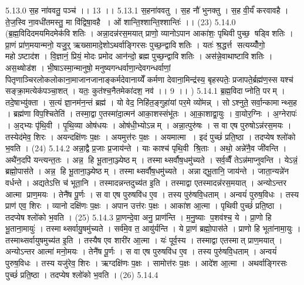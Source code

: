 \setcounter{anuvakam}{0}
5.13.0
स॒ह ना॑ववतु॒ पञ्च॑ ।। 13 ।।
5.13.1
स॒हना॑ववतु । स॒ह नौ॑ भुनक्तु । स॒ह वी॒र्यं॑ करवावहै । ते॒ज॒स्वि ना॒वधी॑तमस्तु॒ मा वि॑द्विषा॒वहै । ओं शान्ति॒श्शान्ति॒श्शान्तिः॑ ।। (23)
5.14.0
(ब्र॒ह्म॒विदिदमयमिदमेक॑विशतिः । अन्ना॒दन्न॑रस॒मयात् प्राणो॒ व्यानोऽपान आका॑शः॒ पृथिवी पुच्छ॒॒ षड्वि॑शतिः । प्रा॒णं प्रा॑ण॒मयान्मनो॒ यजु॒र्॒ ऋख्सामादे॒शोऽथर्वाङ्गिरसः पुच्छ॒न्द्वावि॑शतिः । यतः॑ श्र॒द्धर्त्त सत्यय्योँ॑गो॒ महोऽष्टाद॑श । वि॒ज्ञानं॒ प्रियं॒ मोदः प्रमोद आन॑न्दो॒ ब्रह्म पुच्छ॒न्द्वावि॑शतिः । अस॑न्ने॒वाथाष्टावि॑शतिः । अस॒थ्षोड॑श । भी॒षाऽस्मा॒न्मानुषो॒ मनुष्यगन्धर्वाणा॒न्देवगन्धर्वाणां॒ पितृणाञ्चिरलोकलोकाना॒माजानजानाङ्कर्मदेवानाय्येँ कर्मणा देवाना॒मिन्द्र॑स्य॒ बृहस्पतेः॒ प्रजापते॒र्ब्रह्म॑ण॒स्स यश्च॑ सङ्क्रा॒मत्येक॑पञ्चा॒शत् । यतः॒ कुत॑श्च॒नैतमेका॑दश॒ नव॑ ।। 9 ।। )
5.14.1
ब्र॒ह्म॒विदाप्नोति॒ परम् । तदे॒षाभ्यु॑क्ता । स॒त्यं ज्ञा॒नम॑न॒न्तं ब्रह्म॑ । यो वेद॒ निहि॑त॒ङ्गुहा॑यां पर॒मे व्यो॑मन्न् । सोऽश्नुते॒ सर्वा॒न्कामान्थ्स॒ह । ब्रह्म॑णा विप॒श्चितेति॑ । तस्मा॒द्वा ए॒तस्मा॑दा॒त्मन॑ आका॒शस्संभू॑तः । आ॒का॒शाद्वा॒युः । वा॒योर॒ग्निः । अ॒ग्नेरापः॑ । अ॒द्भ्यः पृ॑थि॒वी । पृ॒थि॒व्या ओष॑धयः । ओष॑धी॒भ्योऽन्नम् । अन्ना॒त्पुरु॑षः । स वा एष पुरुषोऽन्न॑रस॒मयः । तस्येद॑मेव॒ शिरः । अयन्दक्षि॑णः प॒क्षः । अयमुत्त॑रः प॒क्षः । अयमात्मा । इदं पुच्छं॑ प्रति॒ष्ठा । तदप्येष श्लो॑को भ॒वति । (24)
5.14.2
अन्ना॒द्वै प्र॒जाः प्र॒जाय॑न्ते । याः काश्च॑ पृथि॒वी श्रि॒ताः । अथो॒ अन्ने॑नै॒व जी॑वन्ति । अथै॑न॒दपि॑ यन्त्यन्त॒तः । अन्न॒॒ हि भू॒ताना॒ञ्ज्येष्ठम् । तस्माथ्सर्वौष॒धमु॑च्यते । सर्व॒व्वैँ तेऽन्न॑माप्नुवन्ति । येऽन्नं॒ ब्रह्मो॒पास॑ते । अन्न॒॒ हि भू॒ताना॒ञ्ज्येष्ठम् । तस्माथ्सर्वौष॒धमु॑च्यते । अन्नाद्भू॒तानि॒ जाय॑न्ते । जाता॒न्यन्ने॑न वर्धन्ते । अद्यतेऽत्ति च॑ भूता॒नि । तस्मादन्नन्तदुच्य॑त इ॒ति । तस्माद्वा एतस्मादन्न॑रस॒मयात् । अन्योऽन्तर आत्मा प्राण॒मयः । तेनै॑ष पू॒र्णः । स वा एष पुरुषवि॑ध ए॒व । तस्य पुरु॑षवि॒धताम् । अन्वयं॑ पुरुष॒विधः । तस्य प्राण॑ एव॒ शिरः । व्यानो दक्षि॑णः प॒क्षः । अपान उत्त॑रः प॒क्षः । आका॑श आ॒त्मा । पृथिवी पुच्छं॑ प्रति॒ष्ठा । तदप्येष श्लो॑को भ॒वति । (25)
5.14.3
प्रा॒णन्दे॒वा अनु॒ प्राण॑न्ति । म॒नु॒ष्याः प॒शव॑श्च॒ ये । प्रा॒णो हि भू॒ताना॒मायुः॑ । तस्माथ्सर्वायु॒षमु॑च्यते । सर्व॑मे॒व त॒ आयु॑र्यन्ति । ये प्रा॒णं ब्रह्मो॒पास॑ते । प्राणो हि भूता॑नामा॒युः । तस्माथ्सर्वायुषमुच्य॑त इ॒ति । तस्यैष एव शारी॑र आ॒त्मा । यः॑ पूर्व॒स्य । तस्माद्वा एतस्मात् प्राण॒मयात् । अन्योऽन्तर आत्मा॑ मनो॒मयः । तेनै॑ष पू॒र्णः । स वा एष पुरुषवि॑ध ए॒व । तस्य पुरु॑षवि॒धताम् । अन्वयं॑ पुरुष॒विधः । तस्य यजु॑रेव॒ शिरः । ऋग्दक्षि॑णः प॒क्षः । सामोत्त॑रः प॒क्षः । आदे॑श आ॒त्मा । अथर्वाङ्गिरसः पुच्छं॑ प्रति॒ष्ठा । तदप्येष श्लो॑को भ॒वति । (26)
5.14.4
